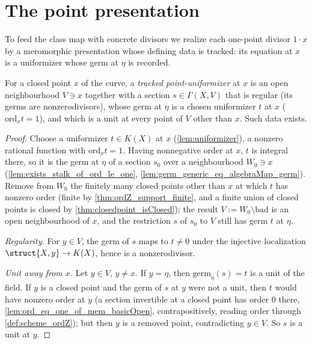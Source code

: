 \section{The point presentation}

To feed the class map with concrete divisors we realize each one-point divisor \(1 \cdot x\) by a
meromorphic presentation whose defining data is tracked: its equation at \(x\) is a uniformizer
whose germ at \(\eta\) is recorded.

\begin{lemma}
  \label{lem:pointUniformizerData}
  \leanok
  For a closed point \(x\) of the curve, a \emph{tracked point-uniformizer} at \(x\) is an open
  neighbourhood \(V \ni x\) together with a section \(s \in \Gamma(X,V)\) that is regular (its
  germs are nonzerodivisors), whose germ at \(\eta\) is a chosen uniformizer \(t\) at \(x\)
  (\(\mathrm{ord}_x t = 1\)), and which is a unit at every point of \(V\) other than \(x\). Such
  data exists.
\end{lemma}
\begin{proof}
  \leanok
  Choose a uniformizer \(t \in K(X)\) at \(x\) (\ref{lem:uniformizer}), a nonzero rational function
  with \(\mathrm{ord}_x t = 1\). Having nonnegative order at \(x\), \(t\) is integral there, so it
  is the germ at \(\eta\) of a section \(s_0\) over a neighbourhood \(W_0 \ni x\)
  (\ref{lem:exists_stalk_of_ord_le_one}, \ref{lem:germ_generic_eq_algebraMap_germ}). Remove from
  \(W_0\) the finitely many closed points other than \(x\) at which \(t\) has nonzero order
  (finite by \ref{thm:ordZ_support_finite}, and a finite union of closed points is closed by
  \ref{thm:closedpoint_isClosed}); the result \(V := W_0 \setminus \mathrm{bad}\) is an open
  neighbourhood of \(x\), and the restriction \(s\) of \(s_0\) to \(V\) still has germ \(t\) at
  \(\eta\).

  \emph{Regularity.} For \(y \in V\), the germ of \(s\) maps to \(t \neq 0\) under the injective
  localization \(\struct{X,y} \to K(X)\), hence is a nonzerodivisor.

  \emph{Unit away from \(x\).} Let \(y \in V\), \(y \neq x\). If \(y = \eta\), then
  \(\mathrm{germ}_\eta(s) = t\) is a unit of the field. If \(y\) is a closed point and the germ of
  \(s\) at \(y\) were not a unit, then \(t\) would have nonzero order at \(y\) (a section invertible
  at a closed point has order \(0\) there, \ref{lem:ord_eq_one_of_mem_basicOpen}, contrapositively,
  reading order through \ref{def:scheme_ordZ}); but then \(y\) is a removed point, contradicting
  \(y \in V\). So \(s\) is a unit at \(y\).
\end{proof}

